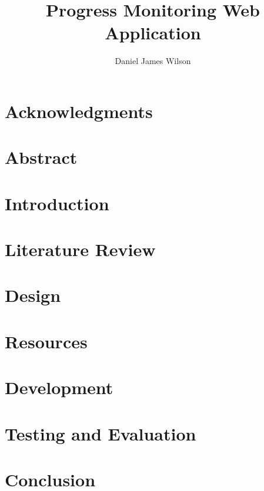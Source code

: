 \documentclass[titlepage,a4paper,11pt,oneside]{book} %
\author{Daniel James Wilson}
\title{Progress Monitoring Web Application}
\date{\parbox{\linewidth}{\centering%
  \today\endgraf\bigskip
  Supervisor:\\
  Moi Hoon Yap}}
\begin{document}
\frontmatter %
\maketitle

\chapter{Acknowledgments}


\chapter{Abstract}


\tableofcontents

\pagebreak
{}
\listoffigures
\pagebreak


\mainmatter %
\chapter{Introduction}
\label{sec:mainIntro}


\chapter{Literature Review}
\label{sec:litrev}


\chapter{Design}
\label{sec:design}


\chapter{Resources}
\label{sec:resources}


\chapter{Development}
\label{sec:dev}


\chapter{Testing and Evaluation}
\label{sec:test}


\chapter{Conclusion}
\label{sec:conc}


\pagebreak
\renewcommand{\bibname}{References}

\end{document}
